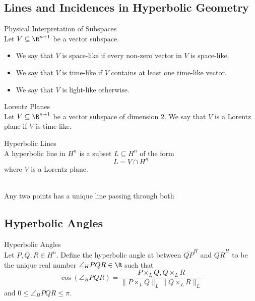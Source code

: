 \documentclass[a4paper]{article}
\begin{document}
\subsection{Lines and Incidences in Hyperbolic Geometry}
\begin{defn}{Physical Interpretation of Subspaces}{}\\
Let $V\subseteq\R^{n+1}$ be a vector subspace. 
\begin{itemize}
\item We say that $V$ is space-like if every non-zero vector in $V$ is space-like. 
\item We say that $V$ is time-like if $V$ contains at least one time-like vector. 
\item We say that $V$ is light-like otherwise. 
\end{itemize}
\end{defn}

\begin{defn}{Lorentz Planes}{}\\
Let $V\subseteq\R^{n+1}$ be a vector subspace of dimension $2$. We say that $V$ is a Lorentz plane if $V$ is time-like. 
\end{defn}

\begin{defn}{Hyperbolic Lines}{}\\
A hyperbolic line in $H^n$ is a subset $L\subseteq H^n$ of the form $$L=V\cap H^n$$ where $V$ is a Lorentz plane. 
\end{defn}

\begin{lmm}{}{}\\
Any two points has a unique line passing through both
\end{lmm}

\subsection{Hyperbolic Angles}
\begin{defn}{Hyperbolic Angles}{}\\
Let $P,Q,R\in H^n$. Define the hyperbolic angle at between $\overline{QP}^H$ and $\overline{QR}^H$ to be the unique real number $\angle_HPQR\in\R$ such that $$\cos(\angle_HPQR)=\frac{P\times_LQ,Q\times_LR}{\|P\times_LQ\|_L\|Q\times_LR\|_L}$$ and $0\leq\angle_HPQR\leq\pi$. 
\end{defn}
\end{document}
